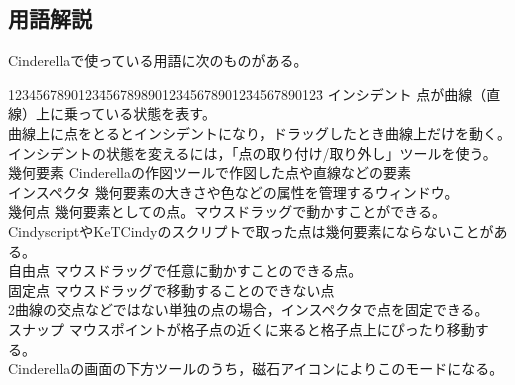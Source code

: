 \documentclass[papersize,a4paper,12pt,uplatex]{jsarticle}
\begin{document}
\subsection{用語解説} 
Cinderellaで使っている用語に次のものがある。
\begin{tabbing}
1234567890123\=456789890123456789012\=34567890123\=\kill
インシデント  \>点が曲線（直線）上に乗っている状態を表す。\\
  \>曲線上に点をとるとインシデントになり，ドラッグしたとき曲線上だけを動く。\\
  \>インシデントの状態を変えるには，「点の取り付け/取り外し」ツールを使う。\\
幾何要素      \>Cinderellaの作図ツールで作図した点や直線などの要素\\
インスペクタ  \>幾何要素の大きさや色などの属性を管理するウィンドウ。\\
幾何点    \>幾何要素としての点。マウスドラッグで動かすことができる。\\
  \>CindyscriptやKeTCindyのスクリプトで取った点は幾何要素にならないことがある。\\
自由点  \>マウスドラッグで任意に動かすことのできる点。\\
固定点  \>マウスドラッグで移動することのできない点\\
  \>2曲線の交点などではない単独の点の場合，インスペクタで点を固定できる。\\ 
スナップ    \>マウスポイントが格子点の近くに来ると格子点上にぴったり移動する。\\
  \>Cinderellaの画面の下方ツールのうち，磁石アイコンによりこのモードになる。\\
 \end{tabbing}
 
\hypertarget{geometrytool}{}
\end{document}
